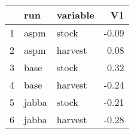 \begin{table}[ht]
\centering
\begin{tabular}{rllr}
  \hline
 & run & variable & V1 \\ 
  \hline
1 & aspm & stock & -0.09 \\ 
  2 & aspm & harvest & 0.08 \\ 
  3 & base & stock & 0.32 \\ 
  4 & base & harvest & -0.24 \\ 
  5 & jabba & stock & -0.21 \\ 
  6 & jabba & harvest & -0.28 \\ 
   \hline
\end{tabular}
\end{table}
